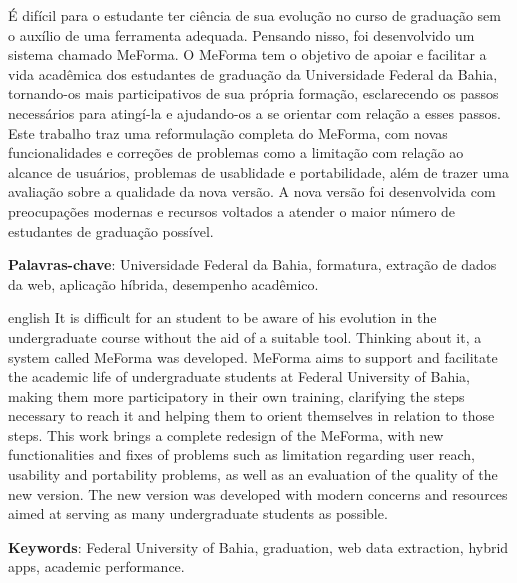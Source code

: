 
\setlength{\absparsep}{18pt} %
\begin{resumo}
É difícil para o estudante ter ciência de sua evolução no curso de graduação sem o auxílio de uma ferramenta adequada. Pensando nisso, foi desenvolvido um sistema chamado MeForma. O MeForma tem o objetivo de apoiar e facilitar a vida acadêmica dos estudantes de graduação da Universidade Federal da Bahia, tornando-os mais participativos de sua própria formação, esclarecendo os passos necessários para atingí-la e ajudando-os a se orientar com relação a esses passos. Este trabalho traz uma reformulação completa do MeForma, com novas funcionalidades e correções de problemas como a limitação com relação ao alcance de usuários, problemas de usablidade e portabilidade, além de trazer uma avaliação sobre a qualidade da nova versão. A nova versão foi desenvolvida com preocupações modernas e recursos voltados a atender o maior número de estudantes de graduação possível.

 \textbf{Palavras-chave}: Universidade Federal da Bahia, formatura, extração de dados da web, aplicação híbrida, desempenho acadêmico.
\end{resumo}

\begin{resumo}[Abstract]
 \begin{otherlanguage*}{english}
It is difficult for an student to be aware of his evolution in the undergraduate course without the aid of a suitable tool. Thinking about it, a system called MeForma was developed. MeForma aims to support and facilitate the academic life of undergraduate students at Federal University of Bahia, making them more participatory in their own training, clarifying the steps necessary to reach it and helping them to orient themselves in relation to those steps. This work brings a complete redesign of the MeForma, with new functionalities and fixes of problems such as limitation regarding user reach, usability and portability problems, as well as an evaluation of the quality of the new version. The new version was developed with modern concerns and resources aimed at serving as many undergraduate students as possible.

   \vspace{\onelineskip}
   \noindent 
   \textbf{Keywords}: Federal University of Bahia, graduation, web data extraction, hybrid apps, academic performance.
 \end{otherlanguage*}
\end{resumo}

